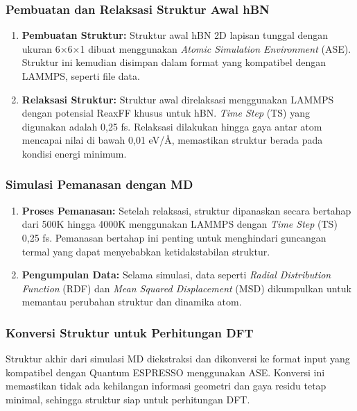 \subsubsection*{Pembuatan dan Relaksasi Struktur Awal hBN}
\label{sec:structure}
\begin{enumerate}
    \item \textbf{Pembuatan Struktur:} Struktur awal hBN 2D lapisan tunggal dengan ukuran 6×6×1 dibuat menggunakan \textit{Atomic Simulation Environment} (ASE). Struktur ini kemudian disimpan dalam format yang kompatibel dengan LAMMPS, seperti file data.
    \item \textbf{Relaksasi Struktur:} Struktur awal direlaksasi menggunakan LAMMPS dengan potensial ReaxFF khusus untuk hBN. \textit{Time Step} (TS) yang digunakan adalah 0,25 fs. Relaksasi dilakukan hingga gaya antar atom mencapai nilai di bawah 0,01 eV/Å, memastikan struktur berada pada kondisi energi minimum.
\end{enumerate}

\subsubsection*{Simulasi Pemanasan dengan MD}
\label{sec:md_simulation}
\begin{enumerate}
    \item \textbf{Proses Pemanasan:} Setelah relaksasi, struktur dipanaskan secara bertahap dari 500K hingga 4000K menggunakan LAMMPS dengan \textit{Time Step} (TS) 0,25 fs. Pemanasan bertahap ini penting untuk menghindari guncangan termal yang dapat menyebabkan ketidakstabilan struktur.
    \item \textbf{Pengumpulan Data:} Selama simulasi, data seperti \textit{Radial Distribution Function} (RDF) dan \textit{Mean Squared Displacement} (MSD) dikumpulkan untuk memantau perubahan struktur dan dinamika atom.
\end{enumerate}

\subsubsection*{Konversi Struktur untuk Perhitungan DFT}
\label{sec:structure_conversion}
Struktur akhir dari simulasi MD diekstraksi dan dikonversi ke format input yang kompatibel dengan Quantum ESPRESSO menggunakan ASE. Konversi ini memastikan tidak ada kehilangan informasi geometri dan gaya residu tetap minimal, sehingga struktur siap untuk perhitungan DFT.

